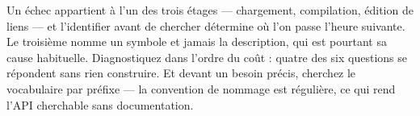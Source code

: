 \documentclass[11pt, a4paper, oneside]{book}
\begin{document}
\begin{partiebilan}
Un échec appartient à l'un des trois étages --- chargement, compilation, édition
de liens --- et l'identifier avant de chercher détermine où l'on passe l'heure
suivante. Le troisième nomme un symbole et jamais la description, qui est
pourtant sa cause habituelle. Diagnostiquez dans l'ordre du coût : quatre des six
questions se répondent sans rien construire. Et devant un besoin précis,
cherchez le vocabulaire par préfixe --- la convention de nommage est régulière,
ce qui rend l'API cherchable sans documentation.
\end{partiebilan}
\end{document}
